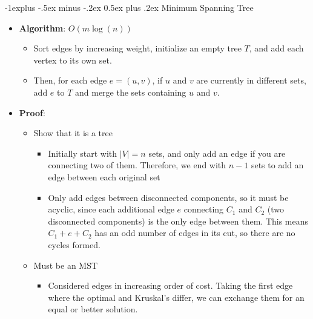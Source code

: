 \documentclass[10pt,landscape,a4paper]{article}
\makeatletter
\renewcommand{\subsection}{\@startsection{subsection}{2}{0mm}%
                                {-1explus -.5ex minus -.2ex}%
                                {0.5ex plus .2ex}%
                                {\normalfont\normalsize\bfseries}}
\makeatother
\begin{document}
\begin{multicols*}{3}
\subsection{Minimum Spanning Tree}
\begin{itemize}
    \item \textbf{Algorithm}: $O(m\log(n))$
    \begin{itemize}
        \item Sort edges by increasing weight, initialize an empty tree $T$, and add each vertex to its own set.
        \item Then, for each edge $e = (u, v)$, if $u$ and $v$ are currently in different sets, add $e$ to $T$ and merge the sets containing $u$ and $v$.
    \end{itemize}
    \item \textbf{Proof}:
    \begin{itemize}
        \item Show that it is a tree
        \begin{itemize}
            \item Initially start with $|V| = n$ sets, and only add an edge if you are connecting two of them. Therefore, we end with $n - 1$ sets to add an edge between each original set
            \item Only add edges between disconnected components, so it must be acyclic, since each additional edge $e$ connecting $C_1$ and $C_2$ (two disconnected components) is the only edge between them. This means $C_1 + e + C_2$ has an odd number of edges in its cut, so there are no cycles formed.
        \end{itemize}
        \item Must be an MST
        \begin{itemize}
            \item Considered edges in increasing order of cost. Taking the first edge where the optimal and Kruskal's differ, we can exchange them for an equal or better solution.
        \end{itemize}
    \end{itemize}
\end{itemize}


\end{multicols*}
\end{document}

